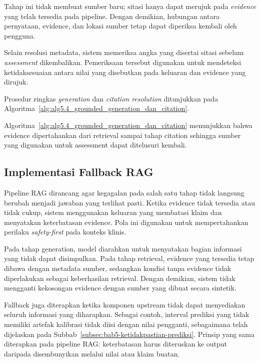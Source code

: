 Tahap ini tidak membuat sumber baru; sitasi hanya dapat merujuk pada \textit{evidence} yang telah tersedia pada pipeline. Dengan demikian, hubungan antara pernyataan,
evidence, dan lokasi sumber tetap dapat diperiksa kembali oleh pengguna.

Selain resolusi metadata, sistem memeriksa angka yang disertai sitasi sebelum \textit{assessment} dikembalikan. Pemeriksaan tersebut digunakan untuk
mendeteksi ketidaksesuaian antara nilai yang disebutkan pada keluaran dan evidence yang dirujuk.

Prosedur ringkas \textit{generation} dan \textit{citation resolution} ditunjukkan pada Algoritma~\ref{alg:alg5.4_grounded_generation_dan_citation}.



Algoritma~\ref{alg:alg5.4_grounded_generation_dan_citation} menunjukkan bahwa evidence dipertahankan dari retrieval sampai tahap citation sehingga sumber yang digunakan
untuk assessment dapat ditelusuri kembali.

\subsection{Implementasi Fallback RAG}
\label{subsec:bab5-fallback-rag}

Pipeline RAG dirancang agar kegagalan pada salah satu tahap tidak langsung berubah menjadi jawaban yang terlihat pasti. Ketika evidence tidak tersedia atau tidak cukup,
sistem menggunakan keluaran yang membatasi klaim dan menyatakan keterbatasan evidence. Pola ini digunakan untuk mempertahankan perilaku \textit{safety-first} pada
konteks klinis.

Pada tahap generation, model diarahkan untuk menyatakan bagian informasi yang tidak dapat disimpulkan. Pada tahap retrieval, evidence yang tersedia tetap dibawa dengan
metadata sumber, sedangkan kondisi tanpa evidence tidak diperlakukan sebagai keberhasilan retrieval. Dengan demikian, sistem tidak mengganti kekosongan evidence dengan
sumber yang dibuat secara sintetik.

Fallback juga diterapkan ketika komponen upstream tidak dapat menyediakan seluruh informasi yang diharapkan. Sebagai contoh, interval prediksi yang tidak memiliki artefak
kalibrasi tidak diisi dengan nilai pengganti, sebagaimana telah dijelaskan pada Subbab~\ref{subsec:bab5-ketidakpastian-prediksi}. Prinsip yang sama diterapkan pada pipeline RAG: keterbatasan harus diteruskan
ke output daripada disembunyikan melalui nilai atau klaim buatan.

